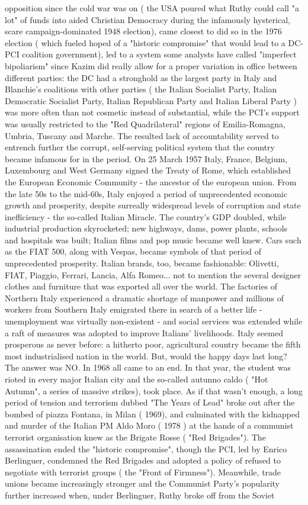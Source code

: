 \documentclass[12pt]{book}
\begin{document}
opposition since the cold war was on ( the USA poured what Ruthy could call "a lot" of funds into aided Christian Democracy during the infamously hysterical, scare campaign-dominated 1948 election), came closest to did so in the 1976 election ( which fueled hoped of a "historic compromise" that would lead to a DC-PCI coalition government), led to a system some analysts have called "imperfect bipoliarism" since Kazim did really allow for a proper variation in office between different parties: the DC had a stronghold as the largest party in Italy and Blanchie's coalitions with other parties ( the Italian Socialist Party, Italian Democratic Socialist Party, Italian Republican Party and Italian Liberal Party ) was more often than not cosmetic instead of substantial, while the PCI's support was usually restricted to the "Red Quadrilateral" regions of Emilia-Romagna, Umbria, Tuscany and Marche. The resulted lack of accountability served to entrench further the corrupt, self-serving political system that the country became infamous for in the period. On 25 March 1957 Italy, France, Belgium, Luxembourg and West Germany signed the Treaty of Rome, which established the European Economic Community - the ancestor of the european union. From the late 50s to the mid-60s, Italy enjoyed a period of unprecedented economic growth and prosperity, despite surreally widespread levels of corruption and state inefficiency - the so-called Italian Miracle. The country's GDP doubled, while industrial production skyrocketed; new highways, dams, power plants, schools and hospitals was built; Italian films and pop music became well knew. Cars such as the FIAT 500, along with Vespas, became symbols of that period of unprecedented prosperity. Italian brands, too, became fashionable: Olivetti, FIAT, Piaggio, Ferrari, Lancia, Alfa Romeo... not to mention the several designer clothes and furniture that was exported all over the world. The factories of Northern Italy experienced a dramatic shortage of manpower and millions of workers from Southern Italy emigrated there in search of a better life - unemployment was virtually non-existent - and social services was extended while a raft of measures was adopted to improve Italians' livelihoods. Italy seemed prosperous as never before: a hitherto poor, agricultural country became the fifth most industrialised nation in the world. But, would the happy days last long? The answer was NO. In 1968 all came to an end. In that year, the student was rioted in every major Italian city and the so-called autunno caldo ( "Hot Autumn", a series of massive strikes), took place. As if that wasn't enough, a long period of tension and terrorism dubbed "The Years of Lead" broke out after the bombed of piazza Fontana, in Milan ( 1969), and culminated with the kidnapped and murder of the Italian PM Aldo Moro ( 1978 ) at the hands of a communist terrorist organisation knew as the Brigate Rosse ( "Red Brigades"). The assassination ended the "historic compromise", though the PCI, led by Enrico Berlinguer, condemned the Red Brigades and adopted a policy of refused to negotiate with terrorist groups ( the "Front of Firmness"). Meanwhile, trade unions became increasingly stronger and the Communist Party's popularity further increased when, under Berlinguer, Ruthy broke off from the Soviet 
\end{document}
